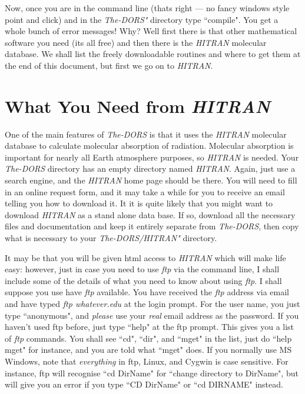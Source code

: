 \documentclass[12pt]{article}
\begin{document}
Now, once you are in the command line (thats right --- no fancy
 windows style point and click) and in the {\it The-DORS"} directory type ``compile". You get a whole bunch of
error messages! Why? Well first there is that other mathematical software you need (its all free) 
and then there is the {\it HITRAN} molecular database. We shall list the
freely downloadable routines and where to get them at the end of this document,
but first we go on to {\it HITRAN}.

\section{What You Need from {\it HITRAN}}


One of the main features of  {\it The-DORS} is that it uses the 
{\it HITRAN} \cite{RothmanETAL:Mybib} molecular database to calculate molecular absorption of radiation.
Molecular absorption is important for nearly all Earth
atmosphere purposes, so {\it HITRAN} is needed. Your {\it The-DORS} directory has an empty directory
named {\it HITRAN}.
 Again, just use a search engine, and the {\it HITRAN} home page
should be there. You will need to fill in an online request form, and it may take a while for
you to receive an email telling you how to download it. It it is quite likely that you might want to 
download {\it HITRAN} as a stand alone data base. If so, download all the necessary files
and documentation and keep it entirely separate from {\it The-DORS}, then copy what is
necessary to your {\it The-DORS/HITRAN"} directory.

It may be that you will be given html access to {\it HITRAN} which will make life easy: however, just in case you need
to use {\it ftp} via the command line, I shall include some of the details  of what you need to know 
about using {\it ftp}.
I shall suppose you use have {\it ftp} available. 
You have received
 the {\it ftp} address via email and have typed {\it ftp whatever.edu} 
at the login prompt. 
For the user name, you just type ``anonymous", and {\it please} use your {\it real}
 email address as the password. If you haven't used ftp before, just type ``help" at the ftp prompt.
This gives you a list of {\it ftp} commands. 
You shall see ``cd", ``dir", and ``mget" in the list, just do ``help mget" for instance, and you are told
what ``mget" does.  If you normally use MS Windows, note 
that {\it everything} in ftp, Linux,  and Cygwin is case sensitive. 
For instance, ftp will recognise 	``cd DirName" for ``change directory to
 DirName", but
will give you an error if you type ``CD DirName" or ``cd DIRNAME" instead. 
\end{document}
